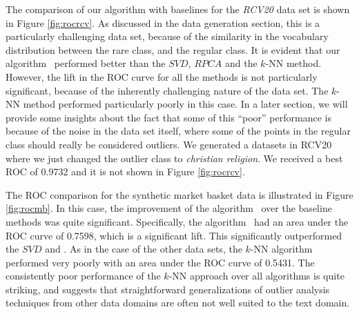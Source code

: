  The comparison of our algorithm with baselines  for the
{\em RCV20} data set is shown in Figure \ref{fig:rocrcv}. As
discussed in the data generation section, this is a particularly
challenging data set, because of the similarity in the vocabulary
distribution between the rare class, and the regular class. It is
evident that our algorithm \algo\  performed better than the
$SVD$, $RPCA$  and the $k$-NN method. However, the lift in  the ROC curve for
all the methods is not particularly significant, because of the
inherently challenging nature of the data set. The $k$-NN
method performed particularly poorly in this case. In a later
section, we will provide some insights about the fact that some of
this ``poor'' performance is because of the noise in the  data set
itself, where some of the  points in the regular class should really
be considered outliers. We generated a datasets in RCV20 where we just changed the outlier class to {\em christian religion}. We received
a best ROC of 0.9732 and it is not shown in Figure \ref{fig:rocrcv}.


 The ROC comparison for the synthetic  market basket data is illustrated
in Figure \ref{fig:rocmb}. In this case, the improvement of the
algorithm \algo\  over the baseline methods was quite  significant.
Specifically, the algorithm \algo\ had an area under the ROC curve
of 0.7598, which is a significant  lift. This significantly
outperformed the $SVD$ and . As in the case of the other data sets, the $k$-NN
algorithm performed very poorly with an area under the ROC curve of
0.5431. The consistently  poor performance of the $k$-NN approach
over all algorithms is quite striking, and suggests that
straightforward generalizations of  outlier analysis techniques from
other data domains are often not well suited to the text domain.

